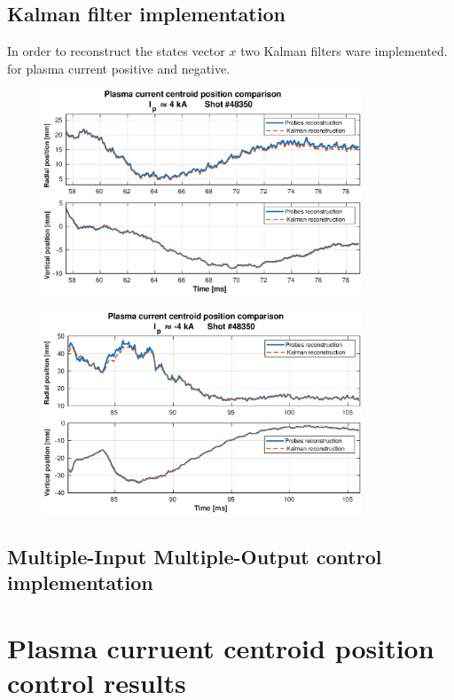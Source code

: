 \subsection{Kalman filter implementation}
In order to reconstruct the states vector $x$ two Kalman filters ware implemented.  for plasma current positive and negative.\smallskip
\begin{figure}
	\centering
	\includegraphics[width=0.85\textwidth]{Chp5/Kalman_comp_pos.eps}
	\caption{\label{Kalman_pos}}
\end{figure}

\begin{figure}
	\centering
	\includegraphics[width=0.85\textwidth]{Chp5/Kalman_comp_neg.eps}
	\caption{\label{Kalman_neg}}
\end{figure}

\subsection{Multiple-Input Multiple-Output control implementation}
	




\section{Plasma curruent centroid position control results}

